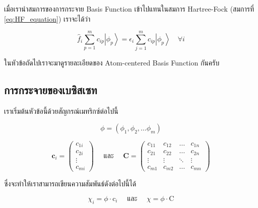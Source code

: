 เมื่อเรานำสมการของการกระจาย Basis Function เข้าไปแทนในสมการ Hartree-Fock (สมการที่ \ref{eq:HF_equation}) เราจะได้ว่า

\begin{equation}
    \label{eq:HF_equation_LCMO}
    \hat{f}_i \sum_{p=1}^m c_{i p}\left|\phi_p\right\rangle 
    = \epsilon_i \sum_{j=1}^m c_{i p}\left|\phi_p\right\rangle \quad \forall i
\end{equation}

ในหัวข้อถัดไปเราจะมาดูรายละเอียดของ Atom-centered Basis Function กันครับ

\subsection{การกระจายของเบซิสเซท}

เราเริ่มต้นหัวข้อนี้ด้วยสัญกรณ์เมทริกซ์ต่อไปนี้

\begin{equation}
    \phi = \left(\phi_1, \phi_2, \dots \phi_m\right)
\end{equation}

\begin{equation}
    \mathbf{c}_i 
    = \left(
        \begin{array}{c}
            c_{1 i} \\
            c_{2 i} \\
            \vdots \\
            c_{m i}
        \end{array}
    \right) 
    \quad \text{ และ } \quad 
    \mathbf{C} 
    = \left(
        \begin{array}{cccc}
            c_{11} & c_{12} & \ldots & c_{1 n} \\
            c_{21} & c_{22} & \ldots & c_{2 n} \\
            \vdots & \vdots & \ddots & \vdots \\
            c_{m 1} & c_{m 2} & \ldots & c_{m n}
        \end{array}
    \right)
\end{equation}

\noindent ซึ่งจะทำให้เราสามารถเขียนความสัมพันธ์ดังต่อไปนี้ได้

\begin{equation}
    \chi_i = \phi \cdot \mathrm{c}_i 
    \quad \text{ และ } \quad 
    \chi = \phi \cdot \mathrm{C}
\end{equation}

